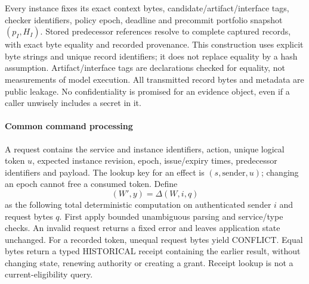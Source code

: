Every instance fixes its exact context bytes, candidate/artifact/interface
tags, checker identifiers, policy epoch, deadline and precommit portfolio
snapshot $(p_I,H_I)$. Stored predecessor references resolve to complete
captured records, with exact byte equality and recorded provenance.
This construction uses explicit byte strings and unique record identifiers;
it does not replace equality by a hash assumption. Artifact/interface
tags are declarations checked for equality, not measurements of model
execution. All transmitted record bytes and metadata are public leakage.
No confidentiality is promised for an evidence object, even if a caller
unwisely includes a secret in it.

\paragraph{Common command processing}
A request contains the service and instance identifiers, action, unique
logical token $u$, expected instance revision, epoch, issue/expiry times,
predecessor identifiers and payload. The lookup key for an effect is
$(s,\mathrm{sender},u)$; changing an epoch cannot free a consumed token.
Define
\[
       (W',y)=\Delta(W,i,q)
\]
as the following total deterministic computation on authenticated sender
$i$ and request bytes $q$.
First apply bounded unambiguous parsing and service/type checks. An
invalid request returns a fixed error and leaves application state unchanged.
For a recorded token, unequal request bytes yield CONFLICT. Equal bytes
return a typed HISTORICAL receipt containing the earlier result, without
changing state, renewing authority or creating a grant. Receipt lookup is
not a current-eligibility query.

